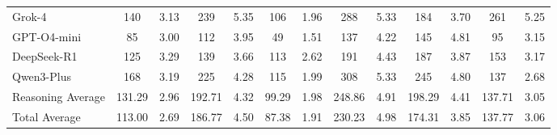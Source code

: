 \documentclass[acmsmall]{acmart}
\begin{document}
\begin{table}[htbp!]
\begin{tabular}{l|cc|cc|cc|cc|cc|cc}
Grok-4 & 140 & 3.13 & 239 & 5.35 & 106 & 1.96 & 288 & 5.33 & 184 & 3.70 & 261 & 5.25 \\
GPT-O4-mini & 85 & 3.00 & 112 & 3.95 & 49 & 1.51 & 137 & 4.22 & 145 & 4.81 & 95 & 3.15 \\
DeepSeek-R1 & 125 & 3.29 & 139 & 3.66 & 113 & 2.62 & 191 & 4.43 & 187 & 3.87 & 153 & 3.17 \\
Qwen3-Plus & 168 & 3.19 & 225 & 4.28 & 115 & 1.99 & 308 & 5.33 & 245 & 4.80 & 137 & 2.68 \\
\midrule
Reasoning Average & 131.29 & 2.96 & 192.71 & 4.32 & 99.29 & 1.98 & 248.86 & 4.91 & 198.29 & 4.41 & 137.71 & 3.05 \\
\midrule
Total Average & 113.00 & 2.69 & 186.77 & 4.50 & 87.38 & 1.91 & 230.23 & 4.98 & 174.31 & 3.85 & 137.77 & 3.06 \\
\bottomrule
\end{tabular}
\end{table}
\end{document}
